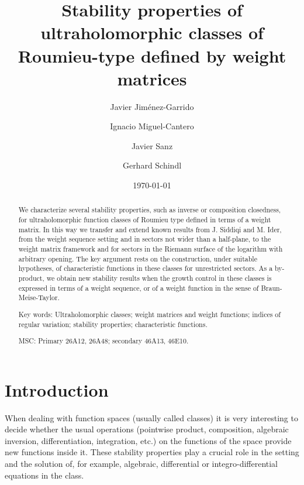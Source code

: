 \documentclass[11pt,a4paper]{article}
\theoremstyle{plain}
\theoremstyle{definition}
\begin{document}
\title{Stability properties of ultraholomorphic classes of Roumieu-type defined by weight matrices}
\author{Javier Jiménez-Garrido \and Ignacio Miguel-Cantero \and Javier Sanz \and Gerhard Schindl}
\date{\today}

\maketitle

\begin{abstract}
We characterize several stability properties, such as inverse or composition closedness, for ultraholomorphic function classes of Roumieu type defined in terms of a weight matrix. In this way we transfer and extend known results from J. Siddiqi and M. Ider, from the weight sequence setting and in sectors not wider than a half-plane, to the weight matrix framework and for sectors in the Riemann surface of the logarithm with arbitrary opening. The key argument rests on the construction, under suitable hypotheses, of characteristic functions in these classes for unrestricted sectors. As a by-product, we obtain new stability results when the growth control in these classes is expressed in terms of a weight sequence, or of a weight function in the sense of Braun-Meise-Taylor.
\par\medskip

\noindent Key words: Ultraholomorphic classes; weight matrices and weight functions; indices of regular variation; stability properties; characteristic functions.
\par
\medskip
{} MSC: Primary 26A12, 26A48; secondary 46A13, 46E10. \end{abstract}

\section{Introduction}

When dealing with function spaces (usually called classes) it is very interesting to decide whether the usual operations (pointwise product, composition, algebraic inversion, differentiation, integration, etc.) on the functions of the space provide new functions inside it. These stability properties play a crucial role in the setting and the solution of, for example, algebraic, differential or integro-differential equations in the class.
\end{document}
